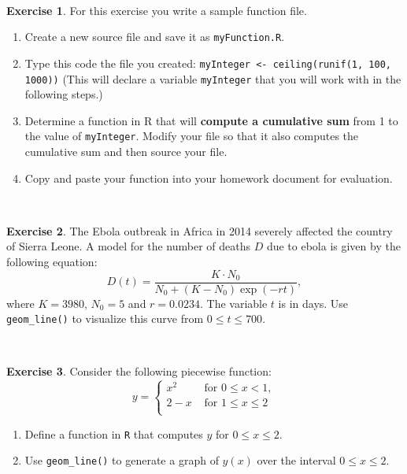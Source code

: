 \documentclass[
]{book}
\theoremstyle{definition}
\theoremstyle{definition}
\theoremstyle{definition}
\newtheorem{exercise}{Exercise}[chapter]
\theoremstyle{remark}
\begin{document}
~
\begin{exercise}
\protect\hypertarget{exr:unnamed-chunk-48}{}{\label{exr:unnamed-chunk-48} }For this exercise you write a sample function file.

\begin{enumerate}[label=\alph*.]
\item Create a new source file and save it as \texttt{myFunction.R}.
\item Type this code the file you created: \texttt{myInteger <- ceiling(runif(1, 100, 1000))} (This will declare a variable \texttt{myInteger} that you will work with in the following steps.)
\item Determine a function in R that will \textbf{compute a cumulative sum} from 1 to the value of \texttt{myInteger}.  Modify your file so that it also computes the cumulative sum and then source your file.
\item Copy and paste your function into your homework document for evaluation.
\end{enumerate}
\end{exercise}

~
\begin{exercise}
\protect\hypertarget{exr:unnamed-chunk-49}{}{\label{exr:unnamed-chunk-49} }The Ebola outbreak in Africa in 2014 severely affected the country of Sierra Leone. A model for the number of deaths \(D\) due to ebola is given by the following equation:
\[ D(t) = \frac{K \cdot N_{0} }{N_{0} + (K-N_{0})  \exp(-rt)}, \]
where \(K = 3980\), \(N_{0}=5\) and \(r = 0.0234\). The variable \(t\) is in days. Use \texttt{geom\_line()} to visualize this curve from \(0 \leq t \leq 700\).
\end{exercise}
~
\begin{exercise}
\protect\hypertarget{exr:unnamed-chunk-50}{}{\label{exr:unnamed-chunk-50} }Consider the following piecewise function:
\begin{equation}
y =
\begin{cases}
x^2 & \text{ for } 0 \leq x < 1,\\
2-x &\text{ for } 1 \leq x \leq  2 \\
\end{cases}
\end{equation}

\begin{enumerate}[label=\alph*.]
\item Define a function in \texttt{R} that computes $y$ for $0 \leq x \leq 2$.
\item Use \texttt{geom\_line()} to generate a graph of $y(x)$ over the interval $0 \leq x \leq 2$.
\end{enumerate}
\end{exercise}
\end{document}
